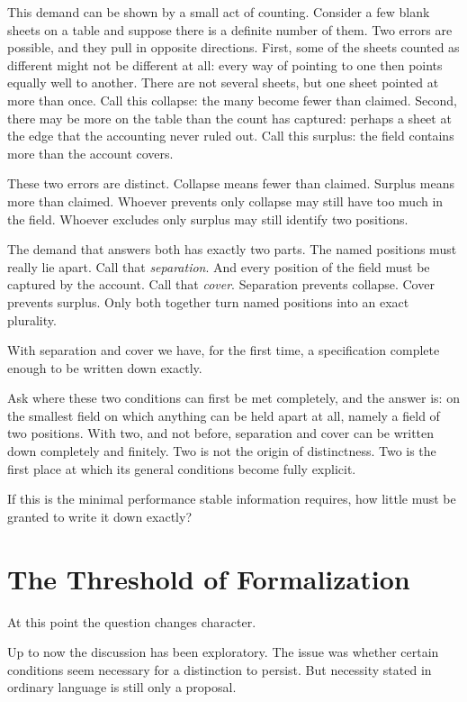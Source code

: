 \documentclass[11pt,a4paper]{book}
\begin{document}
This demand can be shown by a small act of counting. Consider a few blank
sheets on a table and suppose there is a definite number of them. Two errors
are possible, and they pull in opposite directions. First, some of the sheets
counted as different might not be different at all: every way of pointing to
one then points equally well to another. There are not several sheets, but
one sheet pointed at more than once. Call this collapse: the many become
fewer than claimed. Second, there may be more on the table than the count
has captured: perhaps a sheet at the edge that the accounting never ruled
out. Call this surplus: the field contains more than the account covers.

These two errors are distinct. Collapse means fewer than claimed. Surplus
means more than claimed. Whoever prevents only collapse may still have too
much in the field. Whoever excludes only surplus may still identify two
positions.

The demand that answers both has exactly two parts. The named positions must
really lie apart. Call that \emph{separation}. And every position of the
field must be captured by the account. Call that \emph{cover}. Separation
prevents collapse. Cover prevents surplus. Only both together turn named
positions into an exact plurality.

With separation and cover we have, for the first time, a specification
complete enough to be written down exactly.

Ask where these two conditions can first be met completely, and the answer
is: on the smallest field on which anything can be held apart at all,
namely a field of two positions. With two, and not before, separation and
cover can be written down completely and finitely. Two is not the origin of
distinctness. Two is the first place at which its general conditions become
fully explicit.

If this is the minimal performance stable information requires, how little
must be granted to write it down exactly?

\chapter{The Threshold of Formalization}
\label{ch:crossing}

At this point the question changes character.

Up to now the discussion has been exploratory. The issue was whether certain
conditions seem necessary for a distinction to persist. But necessity stated
in ordinary language is still only a proposal.
\end{document}
